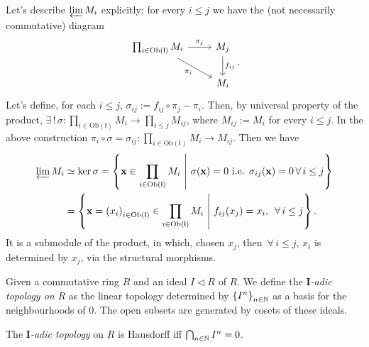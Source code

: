 \begin{ex}
	Let's describe $\varprojlim M_i$ explicitly: for every $i \leq j$ we have the (not necessarily commutative) diagram
	\begin{equation}
	\begin{tikzcd}
		\prod_{i \in \mathrm{Ob} \left(\mathsf{I}\right)} M_i \arrow[r, "\pi_j", rightarrow] \arrow[rd, "\pi_i"', rightarrow] &
		M_j \arrow[d, "f_{ij}", rightarrow] \\
		& M_i
	\end{tikzcd} 
	.\end{equation}
	Let's define, for each $i \leq j$, $\sigma_{ij} := f_{ij} \circ\pi_j - \pi_i$.
	Then, by universal property of the product,
	$\exists\, !\, \sigma: \prod_{i \in \mathrm{Ob} \left(\mathsf{I}\right)} M_i \to \prod_{i \leq j} M_{ij}$,
	where $M_{ij} := M_i$ for every $i \leq j$.
	In the above construction $\pi_i \circ\sigma = \sigma_{ij}: \prod_{i \in \mathrm{Ob} \left(\mathsf{I}\right)} M_i \to M_{ij}$.
	Then we have
	\begin{align}
		\varprojlim M_i &\simeq \ker \sigma =
		\left\{ \mathbf{x} \in \prod_{i \in \mathrm{Ob} \left(\mathsf{I}\right)}
			M_i \ \middle|\ \sigma(\mathbf{x}) = 0
		\text{ i.e. } \sigma_{ij}(\mathbf{x}) =0 \,\forall\, i \leq j \right\} \\
				&=
		\left\{ \mathbf{x} = \left( x_i \right)_{i \in \mathrm{Ob} \left(\mathsf{I}\right)} \in
		\prod_{i \in \mathrm{Ob} \left(\mathsf{I}\right)} M_i \ \middle|\ 
		f_{ij}(x_j) = x_i, \ \,\forall\, i \leq j \right\}
	.\end{align} 
	It is a submodule of the product, in which, chosen $x_j$, then $\,\forall\, i \leq j$, $x_i$ is determined by $x_j$, via the structural morphisms.
\end{ex} 

\begin{defn}
	Given a commutative ring $R$ and an ideal $I \triangleleft R$ of $R$.
	We define the {\em $\mathbf{I}$-adic topology on} $R$ as the linear topology determined by
	$\left\{ I^n \right\}_{n \in \mathbb{N}}$ as a basis for the neighbourhoods of $0$.
	The open subsets are generated by cosets of these ideals.
\end{defn}

\begin{rem}
	The {\em $\mathbf{I}$-adic topology} on $R$ is Hausdorff iff $\bigcap_{n \in \mathbb{N}} I^n = 0$.
\end{rem} 

